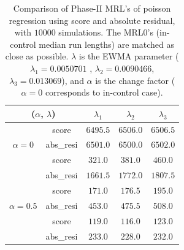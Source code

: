 \documentclass[twoside,11pt]{article}
\begin{document}
\begin{table}[!t]
\centering
\begin{tabular}{ccccc}
\toprule
\multicolumn{2}{c}{($ \alpha$, $ \lambda$)} & {$ \lambda_1$} & {$ \lambda_2$} & {$ \lambda_3$} \\
\midrule
\multirow{3}{*}{$\alpha=0$} & score &$6495.5$ & $6506.0$ & $6506.5$ \\
& abs\_resi &$6501.0$ & $6500.0$ & $6502.0$ \\
\midrule
\multirow{3}{*}{$\alpha=0.3$} & score &$\bm{321.0}$ & $\bm{381.0}$ & $\bm{460.0}$ \\
& abs\_resi &$1661.5$ & $1772.0$ & $1807.5$ \\
\midrule
\multirow{3}{*}{$\alpha=0.5$} & score &$\bm{171.0}$ & $\bm{176.5}$ & $\bm{195.0}$ \\
& abs\_resi &$453.0$ & $475.5$ & $508.0$ \\
\midrule
\multirow{3}{*}{$\alpha=0.7$} & score &$\bm{119.0}$ & $\bm{116.0}$ & $\bm{123.0}$ \\
& abs\_resi &$233.0$ & $228.0$ & $232.0$ \\
\midrule
\end{tabular}
\caption{Comparison of Phase-II MRL's of poisson regression using score and absolute residual, with $10000$ simulations. The MRL0's (in-control median run lengths) are matched as close as possible. $ \lambda$ is the EWMA parameter ({$ \lambda_1=0.0050701$} , {$ \lambda_2=0.0090466$}, {$ \lambda_3=0.013069$}), and $\alpha$ is the change factor ($ \alpha=0$ corresponds to in-control case).}
\label{tab:pois_MRL}
\end{table}
\end{document}
